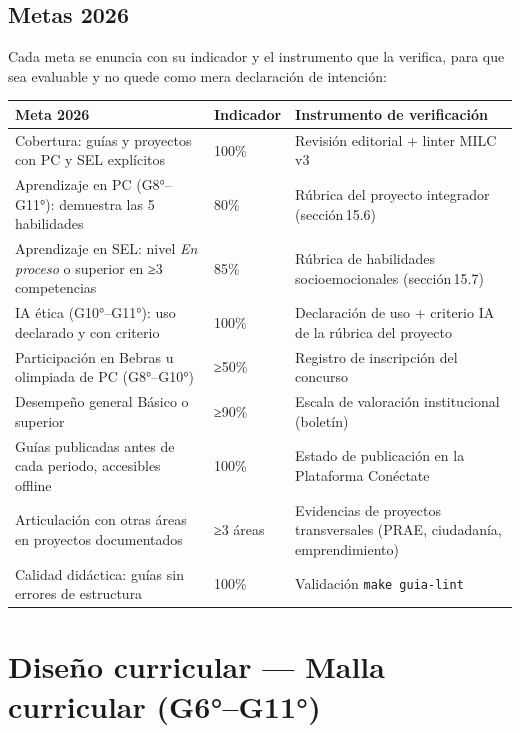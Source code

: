\documentclass[12pt, a4paper]{article}
\renewcommand{\arraystretch}{1.4}
\begin{document}
\subsection{Metas 2026}

Cada meta se enuncia con su indicador y el instrumento que la verifica, para que
sea evaluable y no quede como mera declaración de intención:

\begin{center}
\footnotesize
\setlength{\tabcolsep}{4pt}
\renewcommand{\arraystretch}{1.25}
\begin{tabular}{|L{5.6cm}|L{1.7cm}|L{5.8cm}|}
\hline
{}
\color{white}\textbf{Meta 2026} &
\color{white}\textbf{Indicador} &
\color{white}\textbf{Instrumento de verificación} \\
\hline
Cobertura: guías y proyectos con PC y SEL explícitos & 100\% & Revisión editorial + linter MILC v3 \\
\hline
Aprendizaje en PC (G8°–G11°): demuestra las 5 habilidades & 80\% & Rúbrica del proyecto integrador (sección\,15.6) \\
\hline
Aprendizaje en SEL: nivel \textit{En proceso} o superior en ≥3 competencias & 85\% & Rúbrica de habilidades socioemocionales (sección\,15.7) \\
\hline
IA ética (G10°–G11°): uso declarado y con criterio & 100\% & Declaración de uso + criterio IA de la rúbrica del proyecto \\
\hline
Participación en Bebras u olimpiada de PC (G8°–G10°) & ≥50\% & Registro de inscripción del concurso \\
\hline
Desempeño general Básico o superior & ≥90\% & Escala de valoración institucional (boletín) \\
\hline
Guías publicadas antes de cada periodo, accesibles offline & 100\% & Estado de publicación en la Plataforma Conéctate \\
\hline
Articulación con otras áreas en proyectos documentados & ≥3 áreas & Evidencias de proyectos transversales (PRAE, ciudadanía, emprendimiento) \\
\hline
Calidad didáctica: guías sin errores de estructura & 100\% & Validación \texttt{make guia-lint} \\
\hline
\end{tabular}
\end{center}

\section{Diseño curricular — Malla curricular (G6°--G11°)}
\end{document}
